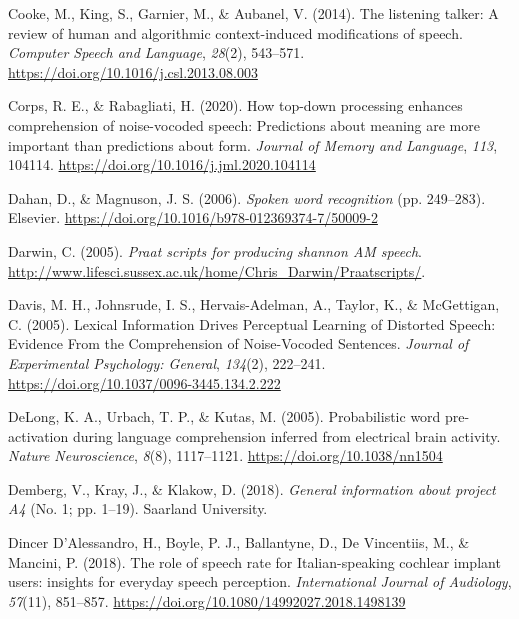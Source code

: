\documentclass[a4paper, nobind]{templates/ociamthesis}
\newlength{\cslhangindent}
\newenvironment{CSLReferences}[2] %
 {%
  \setlength{\parindent}{0pt}
  \ifodd #1
  \let\oldpar\par
  \def\par{\hangindent=\cslhangindent\oldpar}
  \fi
  \setlength{\parskip}{1mm}
  \setlength{\baselineskip}{6mm}
 }%
 {}
\begin{document}
\begin{CSLReferences}{1}{0}
\leavevmode{}%
Cooke, M., King, S., Garnier, M., \& Aubanel, V. (2014). {The listening talker: A review of human and algorithmic context-induced modifications of speech}. \emph{Computer Speech and Language}, \emph{28}(2), 543--571. \url{https://doi.org/10.1016/j.csl.2013.08.003}

\leavevmode{}%
Corps, R. E., \& Rabagliati, H. (2020). How top-down processing enhances comprehension of noise-vocoded speech: Predictions about meaning are more important than predictions about form. \emph{Journal of Memory and Language}, \emph{113}, 104114. \url{https://doi.org/10.1016/j.jml.2020.104114}

\leavevmode{}%
Dahan, D., \& Magnuson, J. S. (2006). \emph{Spoken word recognition} (pp. 249--283). Elsevier. \url{https://doi.org/10.1016/b978-012369374-7/50009-2}

\leavevmode{}%
Darwin, C. (2005). \emph{Praat scripts for producing shannon AM speech}. \url{http://www.lifesci.sussex.ac.uk/home/Chris_Darwin/Praatscripts/}.

\leavevmode{}%
Davis, M. H., Johnsrude, I. S., Hervais-Adelman, A., Taylor, K., \& McGettigan, C. (2005). Lexical Information Drives Perceptual Learning of Distorted Speech: Evidence From the Comprehension of Noise-Vocoded Sentences. \emph{Journal of Experimental Psychology: General}, \emph{134}(2), 222--241. \url{https://doi.org/10.1037/0096-3445.134.2.222}

\leavevmode{}%
DeLong, K. A., Urbach, T. P., \& Kutas, M. (2005). Probabilistic word pre-activation during language comprehension inferred from electrical brain activity. \emph{Nature Neuroscience}, \emph{8}(8), 1117--1121. \url{https://doi.org/10.1038/nn1504}

\leavevmode{}%
Demberg, V., Kray, J., \& Klakow, D. (2018). \emph{{General information about project A4}} (No. 1; pp. 1--19). Saarland University.

\leavevmode{}%
Dincer D'Alessandro, H., Boyle, P. J., Ballantyne, D., De Vincentiis, M., \& Mancini, P. (2018). {The role of speech rate for Italian-speaking cochlear implant users: insights for everyday speech perception}. \emph{International Journal of Audiology}, \emph{57}(11), 851--857. \url{https://doi.org/10.1080/14992027.2018.1498139}


\end{CSLReferences}
\end{document}
